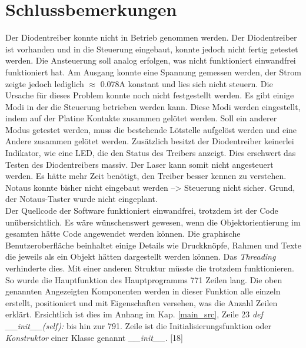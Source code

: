 \section{Schlussbemerkungen}
Der Diodentreiber konnte nicht in Betrieb genommen werden. Der Diodentreiber ist vorhanden und in die Steuerung eingebaut, konnte jedoch nicht fertig getestet werden. Die Ansteuerung soll analog erfolgen, was nicht funktioniert einwandfrei funktioniert hat. Am Ausgang konnte eine Spannung gemessen werden, der Strom zeigte jedoch lediglich $\approx$ 0.078A konstant und lies sich nicht steuern. Die Ursache für dieses Problem konnte noch nicht festgestellt werden. Es gibt einige Modi in der die Steuerung betrieben werden kann. Diese Modi werden eingestellt, indem auf der Platine Kontakte zusammen gelötet werden. Soll ein anderer Modus getestet werden, muss die bestehende Lötstelle aufgelöst werden und eine Andere zusammen gelötet werden. Zusätzlich besitzt der Diodentreiber keinerlei Indikator, wie eine LED, die den Status des Treibers anzeigt. Dies erschwert das Testen des Diodentreibers massiv. Der Laser kann somit nicht angesteuert werden. Es hätte mehr Zeit benötigt, den Treiber besser kennen zu verstehen.\\

Notaus konnte bisher nicht eingebaut werden --> Steuerung nicht sicher. Grund, der Notaus-Taster wurde nicht eingeplant.\\

Der Quellcode der Software funktioniert einwandfrei, trotzdem ist der Code unübersichtlich. Es wäre wünschenswert gewesen, wenn die Objektorientierung im gesamten hätte Code angewendet werden können. Die graphische Benutzeroberfläche beinhaltet einige Details wie Druckknöpfe, Rahmen und Texte die jeweils als ein Objekt hätten dargestellt werden können. Das \textit{Threading} verhinderte dies. Mit einer anderen Struktur müsste die trotzdem funktionieren. So wurde die Hauptfunktion des Hauptprogramms 771 Zeilen lang. Die oben genannten Angezeigten Komponenten werden in dieser Funktion alle einzeln erstellt, positioniert und mit Eigenschaften versehen, was die Anzahl Zeilen erklärt. Ersichtlich ist dies im Anhang im Kap. \ref{main_src}, Zeile 23 \textit{def \_\_init\_\_(self):} bis hin zur 791. Zeile ist die Initialisierungsfunktion oder \textit{Konstruktor} einer Klasse genannt \textit{\_\_init\_\_}. [18]\\

